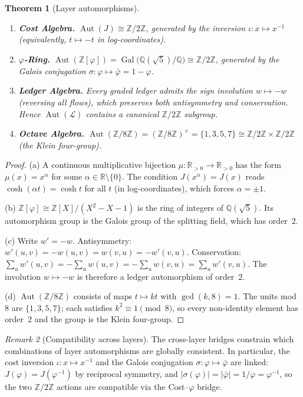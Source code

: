 \documentclass[11pt,a4paper]{article}
\theoremstyle{plain}
\newtheorem{theorem}{Theorem}[section]
\theoremstyle{definition}
\theoremstyle{remark}
\newtheorem{remark}[theorem]{Remark}
\newcommand{\phig}{\varphi}
\newcommand{\psig}{\bar\varphi}          %
\newcommand{\Jcost}{J}
\newcommand{\RR}{\mathbb{R}}
\newcommand{\ZZ}{\mathbb{Z}}
\newcommand{\conj}{\sigma}               %
\begin{document}
\begin{theorem}[Layer automorphisms]\label{thm:aut}
\begin{enumerate}[nosep,label=\textup{(\alph*)}]
\item \textbf{Cost Algebra.}
  $\operatorname{Aut}(\Jcost)\cong\ZZ/2\ZZ$, generated by the
  inversion $\iota:x\mapsto x^{-1}$ (equivalently, $t\mapsto-t$ in
  log-coordinates).
\item \textbf{$\phig$-Ring.}
  $\operatorname{Aut}(\ZZ[\phig])
  =\operatorname{Gal}\bigl(\mathbb{Q}(\sqrt5)\big/\mathbb{Q}\bigr)
  \cong\ZZ/2\ZZ$, generated by the Galois conjugation
  $\conj:\phig\mapsto\psig=1{-}\phig$.
\item \textbf{Ledger Algebra.}
  Every graded ledger admits the sign involution $w\mapsto-w$
  (reversing all flows), which preserves both antisymmetry and
  conservation.  Hence $\operatorname{Aut}(\mathcal L)$ contains a
  canonical $\ZZ/2\ZZ$ subgroup.
\item \textbf{Octave Algebra.}
  $\operatorname{Aut}(\ZZ/8\ZZ)=(\ZZ/8\ZZ)^\times=\{1,3,5,7\}
  \cong\ZZ/2\ZZ\times\ZZ/2\ZZ$ (the Klein four-group).
\end{enumerate}
\end{theorem}

\begin{proof}
(a) A continuous multiplicative bijection $\mu:\RR_{>0}\to\RR_{>0}$
has the form $\mu(x)=x^\alpha$ for some $\alpha\in\RR\setminus\{0\}$.
The condition $\Jcost(x^\alpha)=\Jcost(x)$ reads
$\cosh(\alpha t)=\cosh t$ for all $t$ (in log-coordinates), which
forces $\alpha=\pm1$.

(b) $\ZZ[\phig]\cong\ZZ[X]/(X^2{-}X{-}1)$ is the ring of integers
of $\mathbb{Q}(\sqrt5)$.  Its automorphism group is the Galois group
of the splitting field, which has order~$2$.

(c) Write $w'=-w$.  Antisymmetry:
$w'(u,v)=-w(u,v)=w(v,u)=-w'(v,u)$.
Conservation: $\sum_u w'(u,v)=-\sum_u w(u,v)=-\sum_u w(v,u)
=\sum_u w'(v,u)$.  The involution $w\mapsto-w$ is therefore a
ledger automorphism of order~$2$.

(d) $\operatorname{Aut}(\ZZ/8\ZZ)$ consists of maps $t\mapsto kt$
with $\gcd(k,8)=1$.  The units mod~$8$ are $\{1,3,5,7\}$; each
satisfies $k^2\equiv1\pmod{8}$, so every non-identity element has
order~$2$ and the group is the Klein four-group.
\end{proof}

\begin{remark}[Compatibility across layers]\label{rem:aut-compat}
The cross-layer bridges constrain which combinations of layer
automorphisms are globally consistent.  In particular, the cost
inversion $\iota:x\mapsto x^{-1}$ and the Galois conjugation
$\conj:\phig\mapsto\psig$ are linked:
$\Jcost(\phig)=\Jcost(\phig^{-1})$ by reciprocal symmetry, and
$|\conj(\phig)|=|\psig|=1/\phig=\phig^{-1}$, so the two
$\ZZ/2\ZZ$ actions are compatible via the Cost--$\phig$ bridge.
\end{remark}
\end{document}
